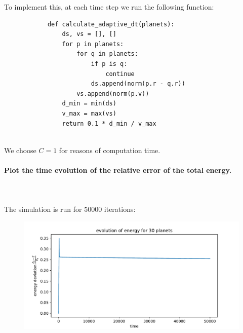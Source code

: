         \newpage \noindent
        To implement this, at each time step we run the following function:
        \begin{lstlisting}
            def calculate_adaptive_dt(planets):
                ds, vs = [], []
                for p in planets:
                    for q in planets:
                        if p is q:
                            continue
                        ds.append(norm(p.r - q.r))
                    vs.append(norm(p.v))
                d_min = min(ds)
                v_max = max(vs)
                return 0.1 * d_min / v_max \end{lstlisting} \ \\
        We choose $C=1$ for reasons of computation time.


    \paragraph{Plot the time evolution of the relative error of the total 
        energy.
    } \ \\
        \\ 
        The simulation is run for $50000$ iterations:
        \begin{figure}[h!]
            \centering
            \includegraphics[width=\textwidth]{./figures/task2_30body_energy_new.pdf}
        \end{figure} \ \\ 

    \newpage
